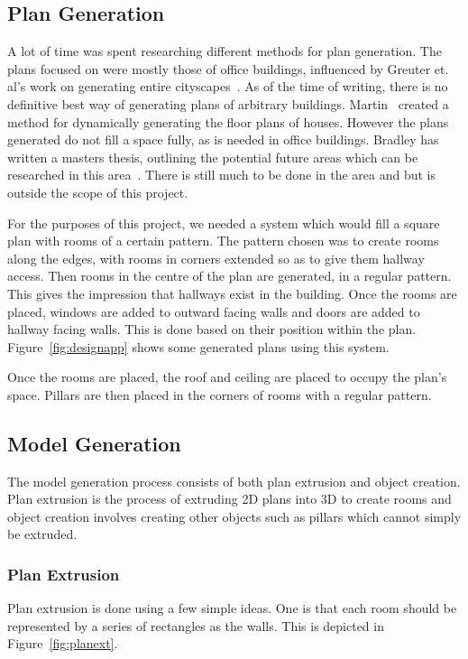 \subsection{Plan Generation}
A lot of time was spent researching different methods for plan generation. 
The plans focused on were mostly those of office buildings, influenced by Greuter et. al's work on generating entire cityscapes~\cite{greuter2003real}.
As of the time of writing, there is no definitive best way of generating plans of arbitrary buildings.
Martin~\cite{martin2006procedural} created a method for dynamically generating the floor plans of houses.
However the plans generated do not fill a space fully, as is needed in office buildings.
Bradley has written a masters thesis, outlining the potential future areas which can be researched in this area~\cite{bradley2005towards}.
There is still much to be done in the area and but is outside the scope of this project.

For the purposes of this project, we needed a system which would fill a square plan with rooms of a certain pattern.
The pattern chosen was to create rooms along the edges, with rooms in corners extended so as to give them hallway access.
Then rooms in the centre of the plan are generated, in a regular pattern.
This gives the impression that hallways exist in the building.
Once the rooms are placed, windows are added to outward facing walls and doors are added to hallway facing walls.
This is done based on their position within the plan.
Figure~\ref{fig:designapp} shows some generated plans using this system.

Once the rooms are placed, the roof and ceiling are placed to occupy the plan's space.
Pillars are then placed in the corners of rooms with a regular pattern.

\subsection{Model Generation}
The model generation process consists of both plan extrusion and object creation.
Plan extrusion is the process of extruding 2D plans into 3D to create rooms and object creation involves creating other objects such as pillars which cannot simply be extruded.

\subsubsection{Plan Extrusion}
\label{sec:planextr}
Plan extrusion is done using a few simple ideas.
One is that each room should be represented by a series of rectangles as the walls.
This is depicted in Figure~\ref{fig:planext}.

